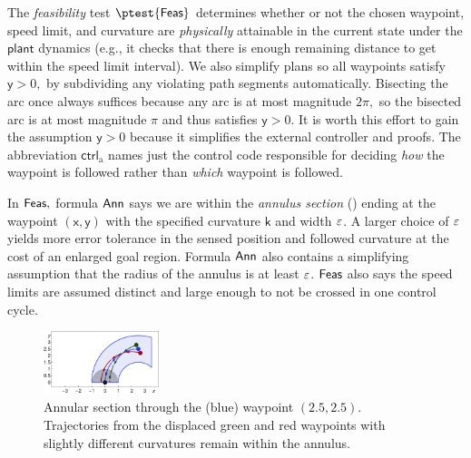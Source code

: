 \documentclass[12pt]{cmuthesis}
\theoremstyle{definition}
\theoremstyle{remark}
\newcommand{\xgvar}{\textsf{x}}
\newcommand{\ygvar}{\textsf{y}}
\newcommand{\kvar}{\textsf{k}}
\newcommand{\ctrl}{\textsf{ctrl}\xspace}
\newcommand{\ctrlliv}{\ctrl_{\text{a}}}
\newcommand{\plant}{\textsf{plant}\xspace}
\newcommand{\rref}[2][]{\prettyref{#2}}
\begin{document}
The \emph{feasibility} test $\ptest{\planreq}$ determines whether or not the chosen waypoint, speed limit, and curvature are \emph{physically} attainable in the current state under the $\plant$ dynamics (e.g., it checks that there is enough remaining distance to get within the speed limit interval).
We also simplify plans so all waypoints satisfy $\ygvar > 0,$ by subdividing any violating path segments automatically.
Bisecting the arc once always suffices because any arc is at most magnitude $2\pi,$ so the bisected arc is at most magnitude $\pi$ and thus satisfies $\ygvar > 0$.
It is worth this effort to gain the assumption $\ygvar > 0$ because it simplifies the external controller and proofs.
The abbreviation $\ctrlliv$ names just the control code responsible for deciding \emph{how} the waypoint is followed rather than \emph{which} waypoint is followed.


In $\textsf{Feas},$ formula $\textsf{Ann}$ says we are within the \emph{annulus section} (\rref{fig:circlestaging}) ending at the waypoint $(\xgvar, \ygvar)$ with the specified curvature $\kvar$ and width $\varepsilon$.
A larger choice of $\varepsilon$ yields more error tolerance in the sensed position and followed curvature at the cost of an enlarged goal region.
Formula $\textsf{Ann}$ also contains a simplifying assumption that the radius of the annulus is at least $\varepsilon$.
$\textsf{Feas}$ also says the speed limits are assumed distinct and large enough to not be crossed in one control cycle.

\begin{figure}[h!]
\centering
\includegraphics[width=0.3\textwidth]{graphics/fig-ode3.pdf}
\caption{Annular section through the (blue) waypoint $(2.5,2.5)$. Trajectories from the displaced green and red waypoints with slightly different curvatures remain within the annulus.}\label{fig:circlestaging}
\label{fig:circlestaging}
\end{figure}
\end{document}
